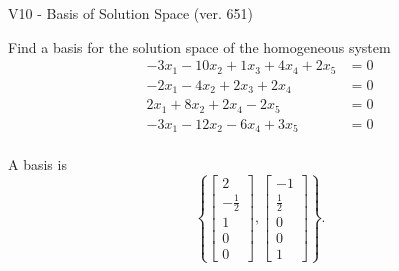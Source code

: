 \begin{exercise}
  \begin{exerciseTitle}V10 - Basis of Solution Space (ver. 651)\end{exerciseTitle}
  \begin{exerciseStatement}
    Find a basis for the solution space of the homogeneous system 
\begin{align*}
 -3 x_ 1 -10 x_ 2 + 1 x_ 3 + 4 x_ 4 + 2 x_ 5 &= 0  \\ 
  -2 x_ 1 -4 x_ 2 + 2 x_ 3 + 2 x_ 4 &= 0  \\ 
  2 x_ 1 + 8 x_ 2 + 2 x_ 4 -2 x_ 5 &= 0  \\ 
  -3 x_ 1 -12 x_ 2 -6 x_ 4 + 3 x_ 5 &= 0  \\ 
 \end{align*}


 
  \end{exerciseStatement}

  \begin{exerciseAnswer}
   A basis is   
\[\left\{\left[\begin{array}{c}
2 \\
-\frac{1}{2} \\
1 \\
0 \\
0
\end{array}\right] , \left[\begin{array}{c}
-1 \\
\frac{1}{2} \\
0 \\
0 \\
1
\end{array}\right]\right\}.\]

  


  \end{exerciseAnswer}
\end{exercise}